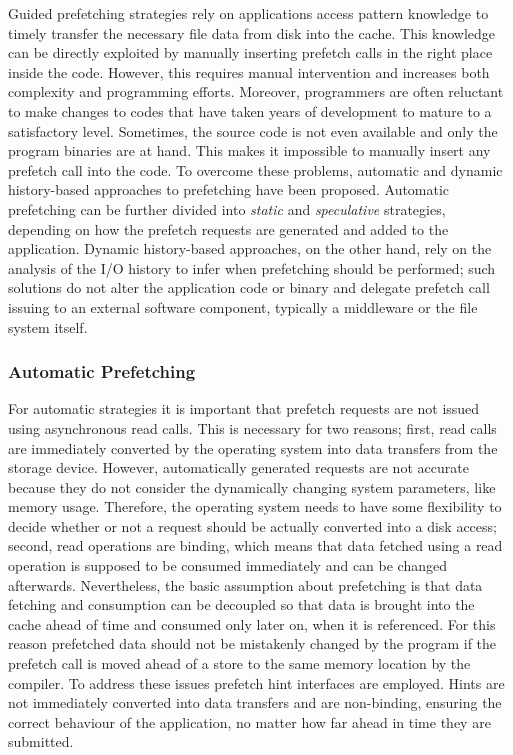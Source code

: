 Guided prefetching strategies rely on applications access pattern knowledge to timely transfer the necessary file data from disk into the cache. This knowledge can be directly exploited by manually inserting prefetch calls in 
the right place inside the code. However, this requires manual intervention and increases both complexity and programming efforts. Moreover, programmers are often reluctant to make changes to codes that have taken years of 
development to mature to a satisfactory level. Sometimes, the source code is not even available and only the program binaries are at hand. This makes it impossible to manually insert any prefetch call into the code. To overcome 
these problems, automatic and dynamic history-based approaches to prefetching have been proposed. Automatic prefetching can be further divided into \textit{static} and \textit{speculative} strategies, depending on how the 
prefetch requests are generated and added to the application. Dynamic history-based approaches, on the other hand, rely on the analysis of the I/O history to infer when prefetching should be performed; such solutions do not alter 
the application code or binary and delegate prefetch call issuing to an external software component, typically a middleware or the file system itself.

\subsubsection{Automatic Prefetching}
For automatic strategies it is important that prefetch requests are not issued using asynchronous read calls. This is necessary for two reasons; first, read calls are immediately converted by the operating system into data transfers 
from the storage device. However, automatically generated requests are not accurate because they do not consider the dynamically changing system parameters, like memory usage. Therefore, the operating system needs to have some 
flexibility to decide whether or not a request should be actually converted into a disk access; second, read operations are binding, which means that data fetched using a read operation is supposed to be consumed immediately and can 
be changed afterwards. Nevertheless, the basic assumption about prefetching is that data fetching and consumption can be decoupled so that data is brought into the cache ahead of time and consumed only later on, when it is referenced. 
For this reason prefetched data should not be mistakenly changed by the program if the prefetch call is moved ahead of a store to the same memory location by the compiler. To address these issues prefetch hint interfaces are employed. Hints are not 
immediately converted into data transfers and are non-binding, ensuring the correct behaviour of the application, no matter how far ahead in time they are submitted.

